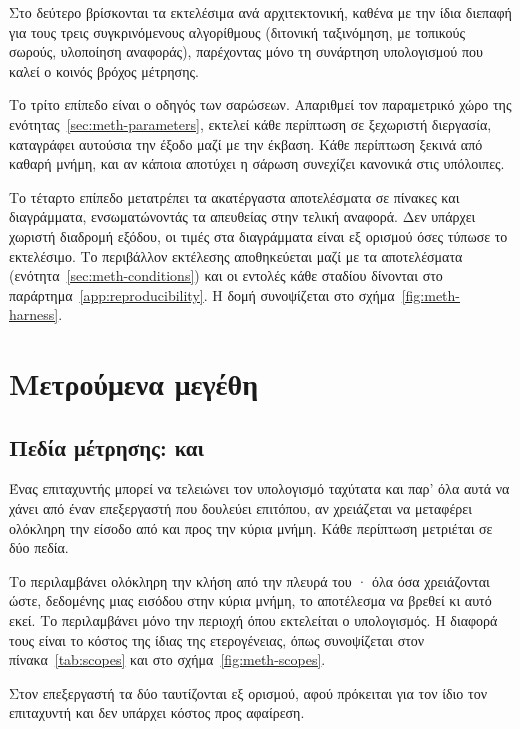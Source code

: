 Στο δεύτερο βρίσκονται τα εκτελέσιμα ανά αρχιτεκτονική, καθένα με την ίδια
διεπαφή για τους τρεις συγκρινόμενους αλγορίθμους (διτονική ταξινόμηση,
 με τοπικούς σωρούς, υλοποίηση αναφοράς), παρέχοντας μόνο τη
συνάρτηση υπολογισμού που καλεί ο κοινός βρόχος μέτρησης.

Το τρίτο επίπεδο είναι ο οδηγός των σαρώσεων. Απαριθμεί τον παραμετρικό χώρο
της ενότητας~\ref{sec:meth-parameters}, εκτελεί κάθε περίπτωση σε ξεχωριστή
διεργασία, καταγράφει αυτούσια την έξοδο μαζί με την έκβαση. Κάθε περίπτωση
ξεκινά από καθαρή μνήμη, και αν κάποια αποτύχει η σάρωση συνεχίζει κανονικά
στις υπόλοιπες.

Το τέταρτο επίπεδο μετατρέπει τα ακατέργαστα αποτελέσματα σε πίνακες και
διαγράμματα, ενσωματώνοντάς τα απευθείας στην τελική αναφορά. Δεν υπάρχει
χωριστή διαδρομή εξόδου, οι τιμές στα διαγράμματα είναι εξ ορισμού όσες τύπωσε
το εκτελέσιμο. Το περιβάλλον εκτέλεσης αποθηκεύεται μαζί με τα αποτελέσματα
(ενότητα~\ref{sec:meth-conditions}) και οι εντολές κάθε σταδίου δίνονται στο
παράρτημα~\ref{app:reproducibility}. Η δομή συνοψίζεται στο
σχήμα~\ref{fig:meth-harness}.



\section{Μετρούμενα μεγέθη}
\label{sec:meth-quantities}

\subsection{Πεδία μέτρησης:  και }
\label{sec:meth-energy-scope}

Ένας επιταχυντής μπορεί να τελειώνει τον υπολογισμό ταχύτατα και παρ' όλα αυτά
να χάνει από έναν επεξεργαστή που δουλεύει επιτόπου, αν χρειάζεται να μεταφέρει
ολόκληρη την είσοδο από και προς την κύρια μνήμη. Κάθε περίπτωση μετριέται σε
δύο πεδία.

Το  περιλαμβάνει ολόκληρη την κλήση από την πλευρά του
· όλα όσα χρειάζονται ώστε, δεδομένης μιας εισόδου στην κύρια μνήμη,
το αποτέλεσμα να βρεθεί κι αυτό εκεί. Το  περιλαμβάνει μόνο την
περιοχή όπου εκτελείται ο υπολογισμός. Η διαφορά τους είναι το κόστος της ίδιας
της ετερογένειας, όπως συνοψίζεται στον πίνακα~\ref{tab:scopes} και στο
σχήμα~\ref{fig:meth-scopes}.

Στον επεξεργαστή τα δύο ταυτίζονται εξ ορισμού, αφού πρόκειται για τον ίδιο τον
επιταχυντή και δεν υπάρχει κόστος  προς αφαίρεση.

